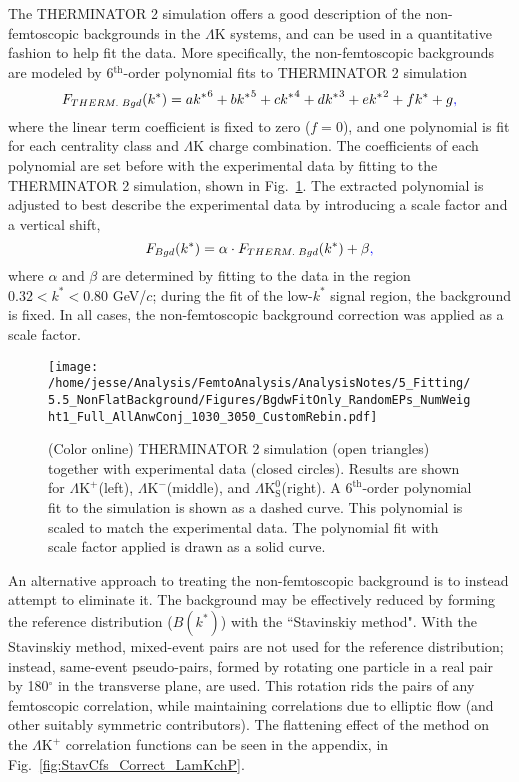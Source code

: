 \documentclass[ALICE,manyauthors]{cernphprep}
\newcommand{\kstar}{$k^{*}$\xspace}
\newcommand{\LamK}{$\Lambda$K\xspace}
\newcommand{\LamKchP}{$\Lambda\mathrm{K^{+}}$\xspace}
\newcommand{\LamKchM}{$\Lambda\mathrm{K^{-}}$\xspace}
\newcommand{\LamKs}{$\Lambda\mathrm{K^{0}_{S}}$\xspace}
\begin{document}
The THERMINATOR 2 simulation offers a good description of the non-femtoscopic backgrounds in the \LamK systems, and can be used in a quantitative fashion to help fit the data.
More specifically, the non-femtoscopic backgrounds are modeled by 6$^{\mathrm{th}}$-order polynomial fits to THERMINATOR 2 simulation{\color{blue}{,}}
\begin{equation}
F_{\scaleto{THERM.\; Bgd}{6pt}}(k^{*}) = a{k^{*}}^{6}+ b{k^{*}}^{5} + c{k^{*}}^{4} + d{k^{*}}^{3} + e{k^{*}}^{2} + fk^{*} + g{\color{blue}{,}}
\end{equation}
where the linear term coefficient is fixed to zero ($f=0$), and one polynomial is fit for each centrality class and \LamK charge combination.
The coefficients of each polynomial are set before {\color{red}{use}} {\color{blue}{application}} with the experimental data by fitting to the THERMINATOR 2 simulation, shown in Fig.~\ref{fig:BgdswTHERM}.
The extracted polynomial is adjusted to best describe the experimental data by introducing a scale factor and a vertical shift,
\begin{equation}
F_{\scaleto{Bgd}{6pt}}(k^{*}) = \alpha\cdot F_{\scaleto{THERM.\; Bgd}{6pt}}(k^{*}) + \beta{\color{blue}{,}}
\end{equation}
where $\alpha$ and $\beta$ are determined by fitting to the data in the region $0.32 < k^{*} < 0.80$ GeV/$c$; during the fit of the low-\kstar signal region, the background is fixed.
In all cases, the non-femtoscopic background correction was applied as a scale factor.


\begin{figure}[h]
  \centering
  \texttt{[image: /home/jesse/Analysis/FemtoAnalysis/AnalysisNotes/5\_Fitting/5.5\_NonFlatBackground/Figures/BgdwFitOnly\_RandomEPs\_NumWeight1\_Full\_AllAnwConj\_1030\_3050\_CustomRebin.pdf]}
  \caption[Backgrounds with THERMINATOR 2]
  {
  (Color online) THERMINATOR 2 simulation (open triangles) together with experimental data (closed circles).  
  Results are shown for \LamKchP (left), \LamKchM (middle), and \LamKs (right).
  A $6^{\mathrm{th}}$-order polynomial fit to the simulation is shown as a dashed curve.  
  This polynomial is scaled to match the experimental data.  
  The polynomial fit with scale factor applied is drawn as a solid curve.
  }
  \label{fig:BgdswTHERM}
\end{figure} 


An alternative approach to treating the non-femtoscopic background is to instead attempt to eliminate it.
The background may be effectively reduced by forming the reference distribution ($B(k^{*})$) with the ``Stavinskiy method".
With the Stavinskiy method, mixed-event pairs are not used for the reference distribution; instead, same-event pseudo-pairs, formed by rotating one particle in a real pair by 180$^\circ$ in the transverse plane, are used.  
This rotation rids the pairs of any femtoscopic correlation, while maintaining correlations due to elliptic flow (and other suitably symmetric contributors).
The flattening effect of the method on the \LamKchP correlation functions can be seen in the appendix, in Fig.~\ref{fig:StavCfs_Correct_LamKchP}.
\end{document}

